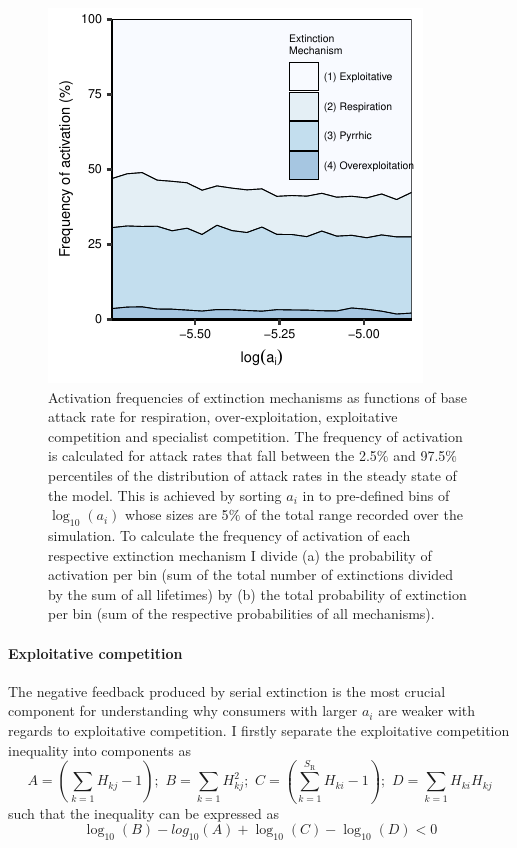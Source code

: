 \documentclass[a4paper]{report}
\DeclareMathOperator{\log}{log}
\begin{document}
{\begin{figure}[H]
\begin{center}
  \includegraphics[scale=1.4]{../Images/activation_frequency.pdf}
  \caption{Activation frequencies of extinction mechanisms as functions of base attack rate
for respiration, over-exploitation, exploitative competition and
specialist competition. The frequency of activation is calculated for attack rates that fall between the 2.5$\%$ and 97.5$\%$ percentiles of the distribution of attack rates in the steady state of the model. This is achieved by sorting $a_i$ in to pre-defined bins of $\log_{10}(a_i)$ whose sizes are 5$\%$ of the total range recorded over the simulation. To calculate the frequency of activation of each respective extinction mechanism I divide (a) the probability of activation per bin (sum of the total number of extinctions divided by the sum of all lifetimes) by (b) the total probability of extinction per bin (sum of the respective probabilities of all mechanisms). \label{fig:frequency}
}
\end{center}
\end{figure}

\paragraph{Exploitative competition} The negative feedback produced by serial extinction is the most crucial component for understanding why consumers with larger $a_i$ are weaker with regards to exploitative competition. I firstly separate the exploitative competition inequality into components as
\begin{equation}
A=(\sum_{k=1}H_{kj}-1);\,\,B=\sum_{k=1}H_{kj}^{2};\,\,C=(\sum_{k=1}^{S_{\mathrm{R}}}H_{ki}-1);\,\,D=\sum_{k=1}H_{ki}H_{kj}\label{eq:comps}
\end{equation}
such that the inequality can be expressed as
\begin{equation}
\log_{10}(B)-log_{10}(A)+\log_{10}(C)-\log_{10}(D) < 0 \label{eq:exploitative_comp2} 
\end{equation}

}
\end{document}

